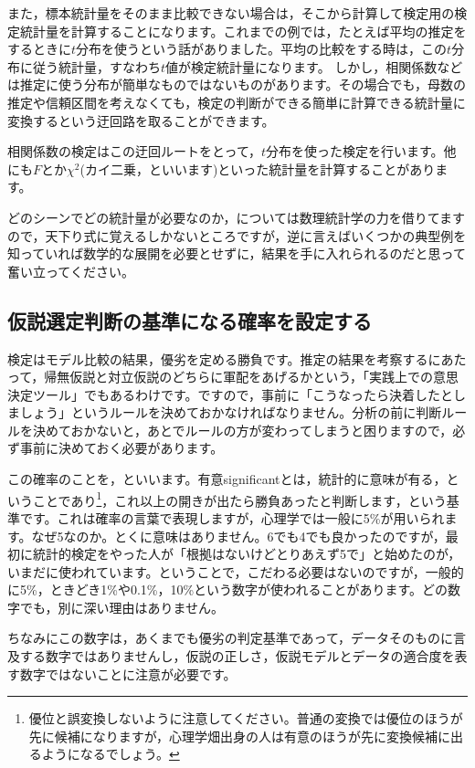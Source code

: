 \documentclass{ltjsbook}
\begin{document}
また，標本統計量をそのまま比較できない場合は，そこから計算して検定用の検定統計量を計算することになります。これまでの例では，たとえば平均の推定をするときに$t$分布を使うという話がありました。平均の比較をする時は，この$t$分布に従う統計量，すなわち$t$値が検定統計量になります。
しかし，相関係数などは推定に使う分布が簡単なものではないものがあります。その場合でも，母数の推定や信頼区間を考えなくても，検定の判断ができる簡単に計算できる統計量に変換するという迂回路を取ることができます。

相関係数の検定はこの迂回ルートをとって，$t$分布を使った検定を行います。他にも$F$とか$\chi^2$(カイ二乗，といいます)といった統計量を計算することがあります。

どのシーンでどの統計量が必要なのか，については数理統計学の力を借りてますので，天下り式に覚えるしかないところですが，逆に言えばいくつかの典型例を知っていれば数学的な展開を必要とせずに，結果を手に入れられるのだと思って奮い立ってください。

\subsection{仮説選定判断の基準になる確率を設定する}
\label{ModelComparison2}
検定はモデル比較の結果，優劣を定める勝負です。推定の結果を考察するにあたって，帰無仮説と対立仮説のどちらに軍配をあげるかという，「実践上での意思決定ツール」でもあるわけです。ですので，事前に「こうなったら決着したとしましょう」というルールを決めておかなければなりません。分析の前に判断ルールを決めておかないと，あとでルールの方が変わってしまうと困りますので，必ず事前に決めておく必要があります。

この確率のことを，といいます。有意significantとは，統計的に意味が有る，ということであり\footnote{優位と誤変換しないように注意してください。普通の変換では優位のほうが先に候補になりますが，心理学畑出身の人は有意のほうが先に変換候補に出るようになるでしょう。}，これ以上の開きが出たら勝負あったと判断します，という基準です。これは確率の言葉で表現しますが，心理学では一般に5\%が用いられます。なぜ5なのか。とくに意味はありません。6でも4でも良かったのですが，最初に統計的検定をやった人が「根拠はないけどとりあえず5で」と始めたのが，いまだに使われています。ということで，こだわる必要はないのですが，一般的に5\%，ときどき1\%や0.1\%，10\%という数字が使われることがあります。どの数字でも，別に深い理由はありません。

ちなみにこの数字は，あくまでも優劣の判定基準であって，データそのものに言及する数字ではありませんし，仮説の正しさ，仮説モデルとデータの適合度を表す数字ではないことに注意が必要です。
\end{document}
